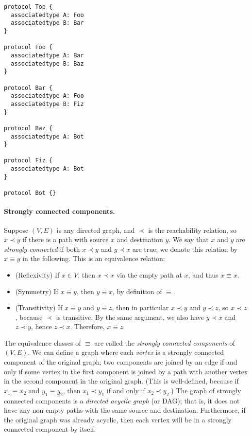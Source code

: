 \documentclass[../generics]{subfiles}
\begin{document}
\begin{listing}\label{protocol component listing}
\begin{Verbatim}
protocol Top {
  associatedtype A: Foo
  associatedtype B: Bar
}

protocol Foo {
  associatedtype A: Bar
  associatedtype B: Baz
}

protocol Bar {
  associatedtype A: Foo
  associatedtype B: Fiz
}

protocol Baz {
  associatedtype A: Bot
}

protocol Fiz {
  associatedtype A: Bot
}

protocol Bot {}
\end{Verbatim}
\end{listing}

\paragraph{Strongly connected components.}
Suppose $(V, E)$ is any directed graph, and $\prec$ is the reachability relation, so $x\prec y$ if there is a path with source $x$ and destination $y$. We say that $x$ and $y$ are \emph{strongly connected} if both $x\prec y$ and $y\prec x$ are true; we denote this relation by $x\equiv y$ in the following. This is an equivalence relation:
\begin{itemize}
\item {}(Reflexivity) If $x\in V$, then $x\prec x$ via the empty path at $x$, and thus $x\equiv x$.
\item {}(Symmetry) If $x\equiv y$, then $y\equiv x$, by definition of $\equiv$.
\item {}(Transitivity) If $x\equiv y$ and $y\equiv z$, then in particular $x\prec y$ and $y\prec z$, so $x\prec z$, because $\prec$ is transitive. By the same argument, we also have $y\prec x$ and $z\prec y$, hence $z\prec x$. Therefore, $x\equiv z$.
\end{itemize}

The equivalence classes of $\equiv$ are called the \emph{strongly connected components} of $(V, E)$. We can define a graph where each \emph{vertex} is a strongly connected component of the original graph; two components are joined by an edge if and only if some vertex in the first component is joined by a path with another vertex in the second component in the original graph. (This is well-defined, because if $x_1\equiv x_2$ and $y_1\equiv y_2$, then $x_1\prec y_1$ if and only if $x_2\prec y_2$.) The graph of strongly connected components is a \emph{directed acyclic graph} (or DAG); that is, it does not have any non-empty paths with the same source and destination. Furthermore, if the original graph was already acyclic, then each vertex will be in a strongly connected component by itself.
\end{document}
